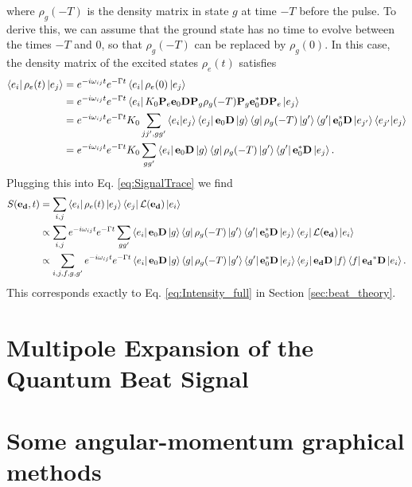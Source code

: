 \documentclass[11pt]{article}
\newcommand{\lag}{\mathcal{L}}
\begin{document}
where $\rho_g(-T)$ is the density matrix in state $g$ at time $-T$ before the pulse. To derive this, we can assume that the ground state has no time to evolve between the times $-T$ and $0$, so that $\rho_g(-T)$ can be replaced by $\rho_g(0)$. In this case, the density matrix of the excited states $\rho_e(t)$ satisfies
\begin{align*}
\bra{e_i} \rho_e(t) \ket{e_j} 
&= e^{-i\omega_{ij}t} e^{-\Gamma t} \bra{e_i} \rho_e(0) \ket{e_j} \nonumber\\
&= e^{-i\omega_{ij}t} e^{-\Gamma t} \bra{e_i} K_0 \mathbf{P}_e \mathbf{e}_0 \mathbf{D} \mathbf{P}_g \rho_g(-T) \mathbf{P}_g \mathbf{e}_0^* \mathbf{D} \mathbf{P}_e \ket{e_j} \nonumber \\
&= e^{-i\omega_{ij}t} e^{-\Gamma t} K_0  \sum_{jj',gg'} \bra{e_i}\ket{e_j}\bra{e_j}\mathbf{e}_0 \mathbf{D} \ket{g}\bra{g} \rho_g(-T) \ket{g'}\bra{g'} \mathbf{e}_0^* \mathbf{D} \ket{e_{j'}}\bra{e_{j'}}\ket{e_j} \\
&= e^{-i\omega_{ij}t} e^{-\Gamma t} K_0  \sum_{gg'} \bra{e_i}\mathbf{e}_0 \mathbf{D} \ket{g}\bra{g} \rho_g(-T) \ket{g'}\bra{g'} \mathbf{e}_0^* \mathbf{D} \ket{e_{j}}.
\end{align*}
Plugging this into Eq. \ref{eq:SignalTrace} we find 
\begin{align}\label{eq:signal_full}
S(\mathbf{e_d},t) &= \sum_{i,j} \bra{e_i}\rho_e(t)\ket{e_j} \bra{e_j}\lag(\mathbf{e_d}) \ket{e_i} \nonumber\\
&\propto \sum_{i,j} e^{-i\omega_{ij}t} e^{-\Gamma t} \sum_{gg'} \bra{e_i}\mathbf{e}_0 \mathbf{D} \ket{g}\bra{g} \rho_g(-T) \ket{g'}\bra{g'} \mathbf{e}_0^* \mathbf{D} \ket{e_{j}} \bra{e_j}\lag(\mathbf{e_d}) \ket{e_i} \nonumber\\
&\propto \sum_{i,j,f,g,g'} e^{-i\omega_{ij}t} e^{-\Gamma t}  \bra{e_i}\mathbf{e}_0 \mathbf{D} \ket{g}\bra{g} \rho_g(-T) \ket{g'}\bra{g'} \mathbf{e}_0^* \mathbf{D} \ket{e_{j}} \bra{e_j}\mathbf{e_d} \mathbf{D}\ket{f}\bra{f}\mathbf{e_d}^* \mathbf{D} \ket{e_i}.
\end{align} 
This corresponds exactly to Eq. \ref{eq:Intensity_full} in Section \ref{sec:beat_theory}.



\section{Multipole Expansion of the Quantum Beat Signal}



\section{Some angular-momentum graphical methods \cite{angular_momentum}}\label{app:angular_momentum}
\end{document}
